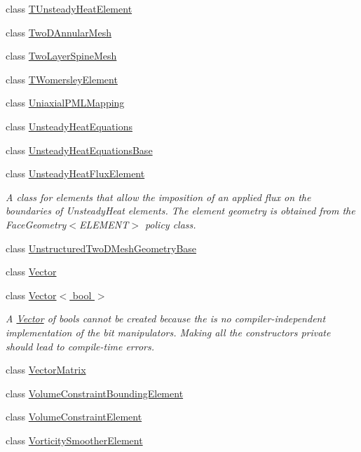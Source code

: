 \begin{DoxyCompactItemize}
class \hyperlink{classoomph_1_1TUnsteadyHeatElement}{T\+Unsteady\+Heat\+Element}
\item 
class \hyperlink{classoomph_1_1TwoDAnnularMesh}{Two\+D\+Annular\+Mesh}
\item 
class \hyperlink{classoomph_1_1TwoLayerSpineMesh}{Two\+Layer\+Spine\+Mesh}
\item 
class \hyperlink{classoomph_1_1TWomersleyElement}{T\+Womersley\+Element}
\item 
class \hyperlink{classoomph_1_1UniaxialPMLMapping}{Uniaxial\+P\+M\+L\+Mapping}
\item 
class \hyperlink{classoomph_1_1UnsteadyHeatEquations}{Unsteady\+Heat\+Equations}
\item 
class \hyperlink{classoomph_1_1UnsteadyHeatEquationsBase}{Unsteady\+Heat\+Equations\+Base}
\item 
class \hyperlink{classoomph_1_1UnsteadyHeatFluxElement}{Unsteady\+Heat\+Flux\+Element}
\begin{DoxyCompactList}\small\item\em A class for elements that allow the imposition of an applied flux on the boundaries of Unsteady\+Heat elements. The element geometry is obtained from the Face\+Geometry$<$\+E\+L\+E\+M\+E\+N\+T$>$ policy class. \end{DoxyCompactList}\item 
class \hyperlink{classoomph_1_1UnstructuredTwoDMeshGeometryBase}{Unstructured\+Two\+D\+Mesh\+Geometry\+Base}
\item 
class \hyperlink{classoomph_1_1Vector}{Vector}
\item 
class \hyperlink{classoomph_1_1Vector_3_01bool_01_4}{Vector$<$ bool $>$}
\begin{DoxyCompactList}\small\item\em A \hyperlink{classoomph_1_1Vector}{Vector} of bools cannot be created because the is no compiler-\/independent implementation of the bit manipulators. Making all the constructors private should lead to compile-\/time errors. \end{DoxyCompactList}\item 
class \hyperlink{classoomph_1_1VectorMatrix}{Vector\+Matrix}
\item 
class \hyperlink{classoomph_1_1VolumeConstraintBoundingElement}{Volume\+Constraint\+Bounding\+Element}
\item 
class \hyperlink{classoomph_1_1VolumeConstraintElement}{Volume\+Constraint\+Element}
\item 
class \hyperlink{classoomph_1_1VorticitySmootherElement}{Vorticity\+Smoother\+Element}

\end{DoxyCompactItemize}

